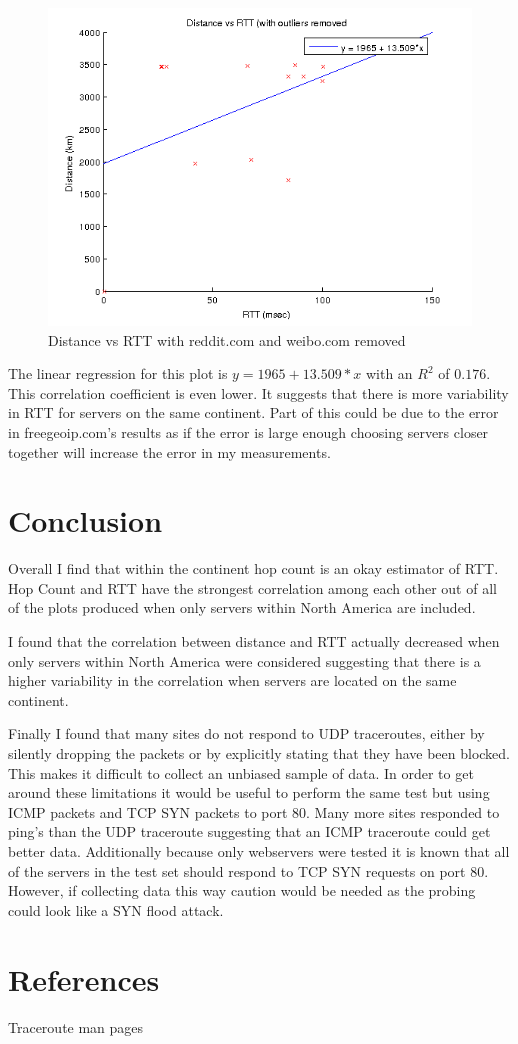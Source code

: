 \documentclass{article}
\begin{document}
\FloatBarrier
\begin{figure}[h!]
  \includegraphics{distance_vs_rtt_no_outliers.png}
  \caption{Distance vs RTT with reddit.com and weibo.com removed}
  \label{fig:scatter6}
\end{figure}
\FloatBarrier

The linear regression for this plot is $y = 1965 + 13.509*x$ with an $R^2$ of $0.176$. This correlation coefficient is even lower. It suggests that there is more variability in RTT for servers on the same continent. Part of this could be due to the error in freegeoip.com's results as if the error is large enough choosing servers closer together will increase the error in my measurements.

\section*{Conclusion}

Overall I find that within the continent hop count is an okay estimator of RTT. Hop Count and RTT have the strongest correlation among each other out of all of the plots produced when only servers within North America are included.

I found that the correlation between distance and RTT actually decreased when only servers within North America were considered suggesting that there is a higher variability in the correlation when servers are located on the same continent.

Finally I found that many sites do not respond to UDP traceroutes, either by silently dropping the packets or by explicitly stating that they have been blocked. This makes it difficult to collect an unbiased sample of data. In order to get around these limitations it would be useful to perform the same test but using ICMP packets and TCP SYN packets to port 80. Many more sites responded to ping's than the UDP traceroute suggesting that an ICMP traceroute could get better data. Additionally because only webservers were tested it is known that all of the servers in the test set should respond to TCP SYN requests on port 80. However, if collecting data this way caution would be needed as the probing could look like a SYN flood attack.

\section*{References}

Traceroute man pages
\end{document}
